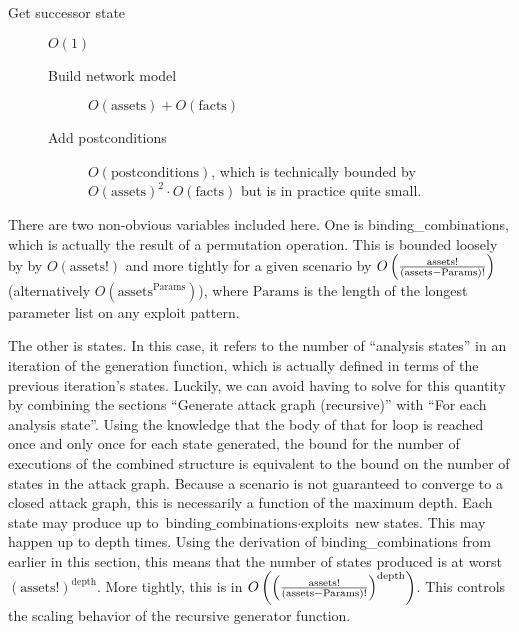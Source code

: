 \begin{description}
\begin{description}
\begin{description}
\begin{description}
\begin{description}
                    \item[Get successor state] $O(1)$
                    \begin{description}
                        \item[Build network model] $O(\text{assets}) + O(\text{facts})$
                        \item[Add postconditions] $O(\text{postconditions})$, which is
                            technically bounded by $O(\text{assets})^2 \cdot O(\text{facts})$
                            but is in practice quite small.
                    \end{description}
                \end{description}
            \end{description}
        \end{description}
    \end{description}
\end{description}
There are two non-obvious variables included here. One is binding\_combinations, which is
actually the result of a permutation operation. This is bounded loosely by
by $O(\text{assets}!)$ and more tightly for a given scenario by 
$O\left({\text{assets}! \over (\text{assets}-\text{Params})!}\right)$ (alternatively $O(\text{assets}^{\text{Params}})$),
where $\text{Params}$ is the length of the longest parameter list on any exploit pattern.

The other is states. In this case, it refers to the number of ``analysis states''
in an iteration of the generation function, which is actually defined in terms
of the previous iteration's states. Luckily, we can avoid having to solve for
this quantity by combining the sections ``Generate attack graph (recursive)''
with ``For each analysis state''. Using the knowledge that the body of that for
loop is reached once and only once for each state generated, the bound for the
number of executions of the combined structure is equivalent to the bound on
the number of states in the attack graph. Because a scenario is not guaranteed
to converge to a closed attack graph, this is necessarily a function of the
maximum depth. Each state may produce up to $\text{binding\_combinations} \cdot
\text{exploits}$ new states. This may happen up to depth times. Using the
derivation of binding\_combinations from earlier in this section, this means 
that the number of states produced is at worst $(\text{assets}!)^{\text{depth}}$.
More tightly, this is in 
$O\left(\left({\text{assets}! \over (\text{assets}-\text{Params})!}\right)^{\text{depth}}\right)$.
This controls the scaling behavior of the recursive generator function.

